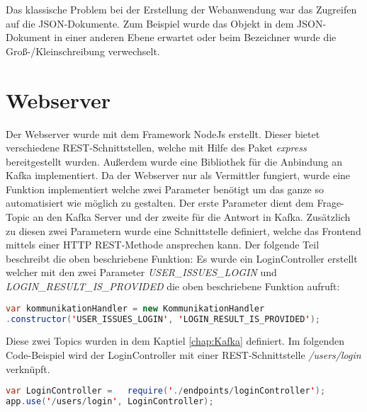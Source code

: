 
Das klassische Problem bei der Erstellung der Webanwendung war das Zugreifen auf die JSON-Dokumente. Zum Beispiel wurde das Objekt in dem JSON-Dokument in einer anderen Ebene erwartet oder beim Bezeichner wurde die Groß-/Kleinschreibung verwechselt.


\section{Webserver}
Der Webserver wurde mit dem Framework NodeJs erstellt. Dieser bietet verschiedene REST-Schnittstellen, welche mit Hilfe des Paket \textit{express} bereitgestellt wurden. Außerdem wurde eine Bibliothek für die Anbindung an Kafka implementiert. Da der Webserver nur als Vermittler fungiert, wurde eine Funktion implementiert welche zwei Parameter benötigt um das ganze so automatisiert wie möglich zu gestalten. Der erste Parameter dient dem Frage-Topic an den Kafka Server und der zweite für die Antwort in Kafka. Zusätzlich zu diesen zwei Parametern wurde eine Schnittstelle definiert, welche das Frontend mittels einer  HTTP REST-Methode ansprechen kann. Der folgende Teil beschreibt die oben beschriebene Funktion: 
Es wurde ein LoginController erstellt welcher mit den zwei Parameter \textit{USER\_ISSUES\_LOGIN} und \textit{LOGIN\_RESULT\_IS\_PROVIDED} die oben beschriebene Funktion aufruft: \\
\begin{lstlisting}[language=Java, basicstyle=\small, firstnumber=1] 
var kommunikationHandler = new KommunikationHandler
.constructor('USER_ISSUES_LOGIN', 'LOGIN_RESULT_IS_PROVIDED');
\end{lstlisting} 
Diese zwei Topics wurden in dem Kaptiel \ref{chap:Kafka} definiert. Im folgenden Code-Beispiel wird der LoginController mit einer REST-Schnittstelle \textit{/users/login} verknüpft. \\
\begin{lstlisting}[language=Java, basicstyle=\small] 
var LoginController = 	require('./endpoints/loginController');
app.use('/users/login', LoginController);
\end{lstlisting}

